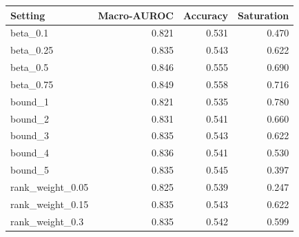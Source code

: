 \begin{tabular}{lrrr}
\toprule
Setting & Macro-AUROC & Accuracy & Saturation\\
\midrule
beta\_0.1 & 0.821 & 0.531 & 0.470\\
beta\_0.25 & 0.835 & 0.543 & 0.622\\
beta\_0.5 & 0.846 & 0.555 & 0.690\\
beta\_0.75 & 0.849 & 0.558 & 0.716\\
bound\_1 & 0.821 & 0.535 & 0.780\\
bound\_2 & 0.831 & 0.541 & 0.660\\
bound\_3 & 0.835 & 0.543 & 0.622\\
bound\_4 & 0.836 & 0.541 & 0.530\\
bound\_5 & 0.835 & 0.545 & 0.397\\
rank\_weight\_0.05 & 0.825 & 0.539 & 0.247\\
rank\_weight\_0.15 & 0.835 & 0.543 & 0.622\\
rank\_weight\_0.3 & 0.835 & 0.542 & 0.599\\
\bottomrule
\end{tabular}
